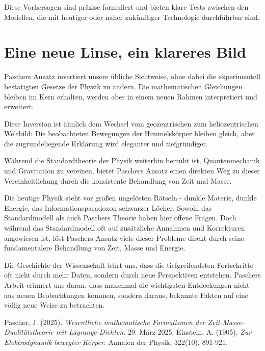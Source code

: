 \documentclass[a4paper,12pt]{article}
\begin{document}
	Diese Vorhersagen sind präzise formuliert und bieten klare Tests zwischen den Modellen, die mit heutiger oder naher zukünftiger Technologie durchführbar sind.
	
	\section{Eine neue Linse, ein klareres Bild}
	Paschers Ansatz invertiert unsere übliche Sichtweise, ohne dabei die experimentell bestätigten Gesetze der Physik zu ändern. Die mathematischen Gleichungen bleiben im Kern erhalten, werden aber in einem neuen Rahmen interpretiert und erweitert.
	
	Diese Inversion ist ähnlich dem Wechsel vom geozentrischen zum heliozentrischen Weltbild: Die beobachteten Bewegungen der Himmelskörper bleiben gleich, aber die zugrundeliegende Erklärung wird eleganter und tiefgründiger.
	
	Während die Standardtheorie der Physik weiterhin bemüht ist, Quantenmechanik und Gravitation zu vereinen, bietet Paschers Ansatz einen direkten Weg zu dieser Vereinheitlichung durch die konsistente Behandlung von Zeit und Masse.
	
	Die heutige Physik steht vor großen ungelösten Rätseln - dunkle Materie, dunkle Energie, das Informationsparadoxon schwarzer Löcher. Sowohl das Standardmodell als auch Paschers Theorie haben hier offene Fragen. Doch während das Standardmodell oft auf zusätzliche Annahmen und Korrekturen angewiesen ist, löst Paschers Ansatz viele dieser Probleme direkt durch seine fundamentalere Behandlung von Zeit, Masse und Energie.
	
	Die Geschichte der Wissenschaft lehrt uns, dass die tiefgreifendsten Fortschritte oft nicht durch mehr Daten, sondern durch neue Perspektiven entstehen. Paschers Arbeit erinnert uns daran, dass manchmal die wichtigsten Entdeckungen nicht aus neuen Beobachtungen kommen, sondern daraus, bekannte Fakten auf eine völlig neue Weise zu betrachten.
	
	\begin{thebibliography}{2}
		 Pascher, J. (2025). \textit{Wesentliche mathematische Formalismen der Zeit-Masse-Dualitätstheorie mit Lagrange-Dichten}. 29. März 2025.
		 Einstein, A. (1905). \textit{Zur Elektrodynamik bewegter Körper}. Annalen der Physik, 322(10), 891-921.
	\end{thebibliography}
	
\end{document}
